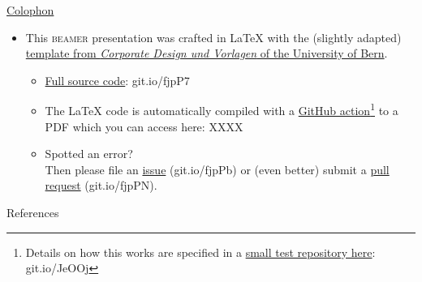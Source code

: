 \documentclass[aspectratio=169,10pt,draft]{beamer}
\begin{document}
\begin{frame}{\href{https://en.wikipedia.org/wiki/Colophon_(publishing)}{Colophon}}
	\begin{itemize} 
		\item This \textsc{beamer} presentation was crafted in \LaTeX\xspace with the (slightly adapted) \href{http://intern.unibe.ch/dienstleistungen/corporate_design_und_vorlagen/praesentationen/index_ger.html}{template from \emph{Corporate Design und Vorlagen} of the University of Bern}.
		\begin{itemize}
			\item \href{https://github.com/habi/lecture.microtomography/}{Full source code}: git.io/fjpP7
			\item The \LaTeX\xspace code is automatically compiled with a \href{https://github.com/actions}{GitHub action}\footnote{Details on how this works are specified in a \href{https://github.com/habi/latex-test/}{small test repository here}: git.io/JeOOj} to a PDF which you can access here: XXXX
			\item Spotted an error?\\%
				Then please file an \href{https://github.com/habi/lecture.microtomography/issues}{issue} (git.io/fjpPb) or (even better) submit a \href{https://github.com/habi/lecture.microtomography/pulls}{pull request} (git.io/fjpPN).
		\end{itemize}
	\end{itemize}
\end{frame}

\begin{frame}{References}
	\printbibliography
\end{frame}
\end{document}
